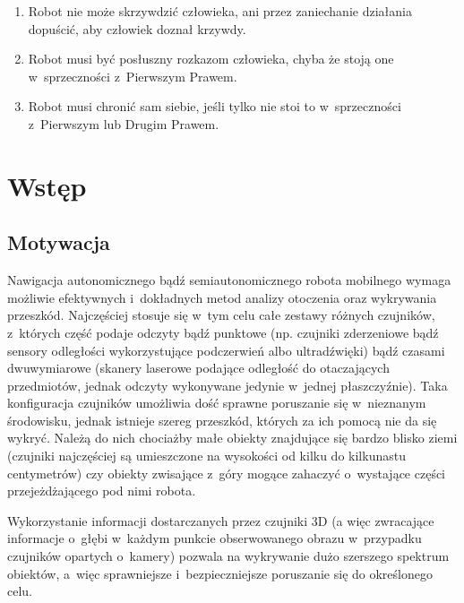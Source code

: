 

\begin{savequote}[90mm]
\begin{enumerate}
\item Robot nie może skrzywdzić człowieka, ani przez zaniechanie działania dopuścić, aby człowiek doznał krzywdy.\\
\item Robot musi być posłuszny rozkazom człowieka, chyba że stoją one w~sprzeczności z~Pierwszym Prawem.\\
\item Robot musi chronić sam siebie, jeśli tylko nie stoi to w~sprzeczności z~Pierwszym lub Drugim Prawem.\end{enumerate}
\end{savequote}


\chapter{Wstęp}
\label{chap:wstep}

\section{Motywacja}

Nawigacja autonomicznego bądź semiautonomicznego robota mobilnego wymaga możliwie
efektywnych i~dokładnych metod analizy otoczenia oraz wykrywania przeszkód.
Najczęściej stosuje się w~tym celu całe zestawy różnych czujników, z~których część
podaje odczyty bądź punktowe (np. czujniki zderzeniowe bądź sensory odległości
wykorzystujące podczerwień albo ultradźwięki) bądź czasami dwuwymiarowe (skanery
laserowe podające odległość do otaczających przedmiotów, jednak odczyty wykonywane
jedynie w~jednej płaszczyźnie). Taka konfiguracja czujników umożliwia dość sprawne
poruszanie się w~nieznanym środowisku, jednak istnieje szereg przeszkód, których za
ich pomocą nie da się wykryć. Należą do nich chociażby małe obiekty znajdujące
się bardzo blisko ziemi (czujniki najczęściej są umieszczone na wysokości od kilku
do kilkunastu centymetrów) czy obiekty zwisające z~góry mogące zahaczyć o~wystające
części przejeżdżającego pod nimi robota.

Wykorzystanie informacji dostarczanych przez czujniki 3D (a więc zwracające informacje
o~głębi w~każdym punkcie obserwowanego obrazu w~przypadku czujników opartych o~kamery)
pozwala na wykrywanie dużo szerszego spektrum obiektów, a~więc sprawniejsze i~bezpieczniejsze
poruszanie się do określonego celu.

